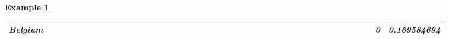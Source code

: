 \documentclass[a4paper,11pt]{report}
\newtheorem{example}[theorem]{Example}
\begin{document}
\begin{example}
\begin{appendices}
\begin{landscape}
\begin{longtable}{r|r|r|r|r|r|r|r|r|r|r|r|r|r|r|r|r|r|r|r|r|r|r|r|r|r|r|r|r|r|r|r|r|r|r|r|r|r|r|r|r|r|}
\multicolumn{1}{|r|}{\textbf{Belgium}}         &                                       &                                       &                                       &                                          &                                       &                                       &                                       &                                       &                                                &                                       &                                      &                                       &                                       &                                      &                                       &                                       &                                       &                                      &                                     &                                      &                                         &                                     &                                       &                                          &                                      &                                      &                                        &                                       &                                      &                                          &                                        &                                     &                                      &                                           &                                               &                                       &                                              &                                      &                                     & 0                                             & 0.169584694                             \\ \hline

\end{longtable}
\end{landscape}
\end{appendices}
\end{example}
\end{document}
